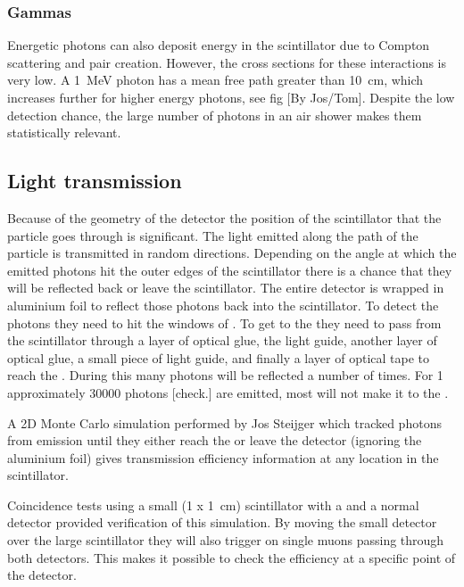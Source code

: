 \subsubsection{Gammas}


Energetic photons can also deposit energy in the scintillator due to
Compton scattering and pair creation. However, the cross sections for
these interactions is very low. A \SI{1}{\MeV} photon  has
a mean free path greater than \SI{10}{\centi\meter}, which increases
further for higher energy photons, see fig [By Jos/Tom]. Despite the low
detection chance, the large number of photons in an air shower makes
them statistically relevant.


\subsection{Light transmission}

Because of the geometry of the detector the position of the scintillator
that the particle goes through is significant. The light emitted along
the path of the particle is transmitted in random directions. Depending
on the angle at which the emitted photons hit the outer edges of the
scintillator there is a chance that they will be reflected back or leave
the scintillator. The entire detector is wrapped in aluminium foil 
to reflect those photons back into the scintillator. To
detect the photons they need to hit the windows of \pmt. To get to the
\pmt they need to pass from the scintillator through a layer of optical
glue, the light guide, another layer of optical glue, a small piece of
light guide, and finally a layer of optical tape to reach the \pmt.
During this many photons will be reflected a number of times. For
\SI{1}{\mip} approximately 30000 photons [check.] are emitted, most will
not make it to the \pmt.

A 2D Monte Carlo simulation performed by Jos Steijger which tracked
photons from emission until they either reach the \pmt or leave the
detector (ignoring the aluminium foil) gives transmission efficiency
information at any location in the scintillator.

Coincidence tests using a small (\SI[product-units = repeat]{1 x
1}{\centi\meter}) scintillator with a \pmt and a normal \hisparc
detector provided verification of this simulation. By moving the small
detector over the large scintillator they will also trigger on single
muons passing through both detectors. This makes it possible to check
the efficiency at a specific point of the detector.

